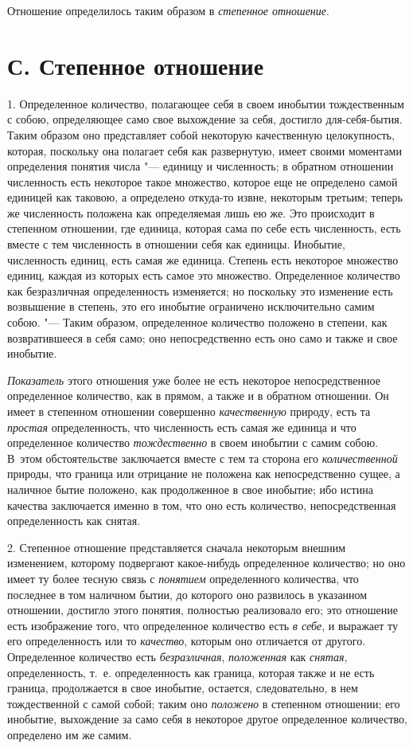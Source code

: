 Отношение определилось таким образом в {\em степенное отношение}.

\section[С. Степенное отношение]{С. Степенное отношение}
1. Определенное количество, полагающее себя в
своем инобытии тождественным с собою, определяющее само свое выхождение за
себя, достигло для-себя-бытия. Таким образом оно представляет собой
некоторую качественную целокупность, которая, поскольку она полагает себя
как развернутую, имеет своими моментами определения понятия числа "--- единицу
и численность; в обратном отношении численность есть некоторое такое
множество, которое еще не определено самой единицей как таковою, а
определено откуда-то извне, некоторым третьим; теперь же численность
положена как определяемая лишь ею же. Это происходит в степенном отношении,
где единица, которая сама по себе есть численность, есть вместе с тем
численность в отношении себя как единицы. Инобытие, численность единиц,
есть самая же единица. Степень есть некоторое множество единиц, каждая из
которых есть самое это множество. Определенное количество как безразличная
определенность изменяется; но поскольку это изменение есть возвышение в
степень, это его инобытие ограничено исключительно самим собою. "--- Таким
образом, определенное количество положено в степени, как возвратившееся в
себя само; оно непосредственно есть оно само и также и свое инобытие.

{\em Показатель} этого отношения уже более не есть
некоторое непосредственное определенное количество, как в прямом, а также и
в обратном отношении. Он имеет в степенном отношении совершенно
{\em качественную} природу, есть та
{\em простая} определенность, что численность есть
самая же единица и что определенное количество
{\em тождественно} в своем инобытии с самим собою.
В~этом обстоятельстве заключается вместе с тем та сторона его
{\em количественной} природы, что граница или отрицание
не положена как непосредственно сущее, а наличное бытие положено, как
продолженное в свое инобытие; ибо истина качества заключается именно в том,
что оно есть количество, непосредственная определенность как снятая.

2. Степенное отношение представляется сначала некоторым внешним изменением,
которому подвергают какое-нибудь определенное количество; но оно имеет ту
более тесную связь с {\em понятием} определенного
количества, что последнее в том наличном бытии, до которого оно развилось в
указанном отношении, достигло этого понятия, полностью реализовало его; это
отношение есть изображение того, что определенное количество есть
{\em в себе}, и выражает ту его определенность или то
{\em качество}, которым оно отличается от другого.
Определенное количество есть {\em безразличная},
{\em положенная} как {\em снятая},
определенность, т.~е. определенность как граница, которая также и не есть
граница, продолжается в свое инобытие, остается, следовательно, в нем
тождественной с самой собой; таким оно {\em положено} в
степенном отношении; его инобытие, выхождение за само себя в некоторое
другое определенное количество, определено им же самим.

